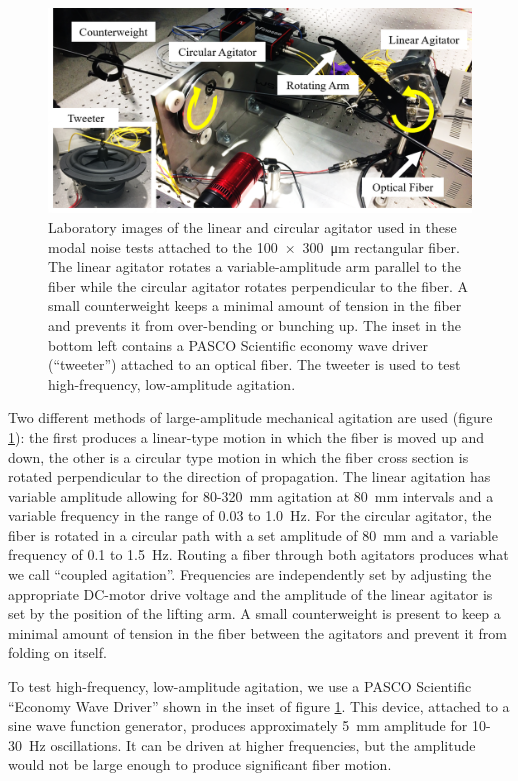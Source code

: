\documentclass[twocolumn]{emulateapj}
\begin{document}
\begin{figure}
\centering
	\includegraphics[width=\columnwidth]{images/agitators_labelled.png}
	\caption{Laboratory images of the linear and circular agitator used in these modal noise tests attached to the \SI{100x300}{\micro\meter} rectangular fiber. The linear agitator rotates a variable-amplitude arm parallel to the fiber while the circular agitator rotates perpendicular to the fiber. A small counterweight keeps a minimal amount of tension in the fiber and prevents it from over-bending or bunching up. The inset in the bottom left contains a PASCO Scientific economy wave driver (``tweeter'') attached to an optical fiber. The tweeter is used to test high-frequency, low-amplitude agitation.}
\label{fig:agitators}
\end{figure}

Two different methods of large-amplitude mechanical agitation are used (figure \ref{fig:agitators}): the first produces a linear-type motion in which the fiber is moved up and down, the other is a circular type motion in which the fiber cross section is rotated perpendicular to the direction of propagation. The linear agitation has variable amplitude allowing for 80-\SI{320}{\milli\meter} agitation at \SI{80}{\milli\meter} intervals and a variable frequency in the range of 0.03 to \SI{1.0}{\hertz}. For the circular agitator, the fiber is rotated in a circular path with a set amplitude of \SI{80}{\milli\meter} and a variable frequency of 0.1 to \SI{1.5}{\hertz}. Routing a fiber through both agitators produces what we call ``coupled agitation''.  Frequencies are independently set by adjusting the appropriate DC-motor drive voltage and the amplitude of the linear agitator is set by the position of the lifting arm. A small counterweight is present to keep a minimal amount of tension in the fiber between the agitators and prevent it from folding on itself.

To test high-frequency, low-amplitude agitation, we use a PASCO Scientific ``Economy Wave Driver'' shown in the inset of figure \ref{fig:agitators}. This device, attached to a sine wave function generator, produces approximately \SI{5}{\milli\meter} amplitude for 10-\SI{30}{\hertz} oscillations. It can be driven at higher frequencies, but the amplitude would not be large enough to produce significant fiber motion.
\end{document}
